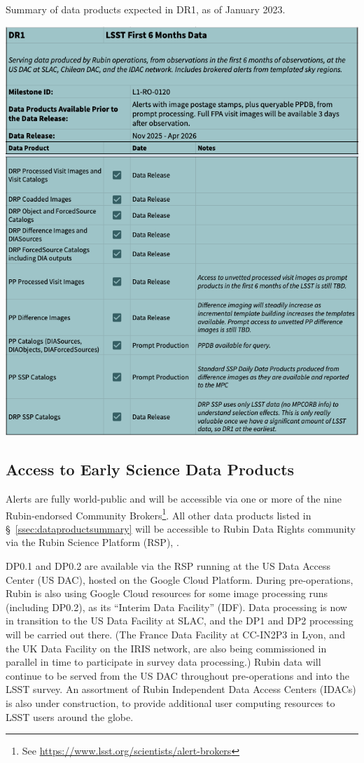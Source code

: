 \begin{table}
\caption{Summary of data products expected in DR1, as of January 2023.}
\label{tab:dr-one-products}
\includegraphics[width=\linewidth]{figures/DR1-products}
\end{table}


\subsection{Access to Early Science  Data Products} \label{ssec:dataaccess}
Alerts are fully world-public and will be accessible via one or more of the nine Rubin-endorsed Community Brokers\footnote{See \url{https://www.lsst.org/scientists/alert-brokers}}.
All other data products listed in \S~\ref{ssec:dataproductsummary} will be accessible to Rubin Data Rights community via the Rubin Science Platform (RSP), \citep{LSE-319}.

DP0.1 and DP0.2 are available via the RSP running at the US Data Access Center (US DAC), hosted on the Google Cloud Platform.
During pre-operations, Rubin is also using Google Cloud resources for some image processing runs (including DP0.2), as its ``Interim Data Facility'' (IDF).
Data processing is now in transition to the US Data Facility at SLAC, and the DP1 and DP2 processing will be carried out there.
(The France Data Facility at CC-IN2P3 in Lyon, and the UK Data Facility on the IRIS network, are also being commissioned in parallel in time to participate in survey data processing.)
Rubin data will continue to be served from the US DAC throughout pre-operations and into the LSST survey.
An assortment of Rubin Independent Data Access Centers (IDACs) is also under construction, to provide additional user computing resources to LSST users around the globe.
